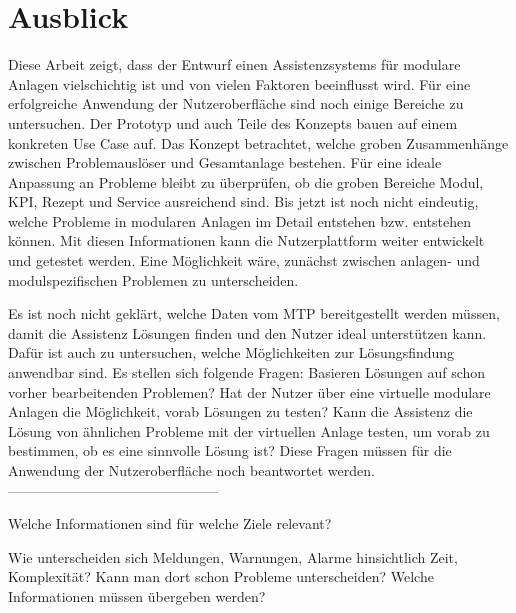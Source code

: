 \chapter{Ausblick}
\label{Ausblick}
Diese Arbeit zeigt, dass der Entwurf einen Assistenzsystems für modulare Anlagen vielschichtig ist und von vielen Faktoren beeinflusst wird. Für eine erfolgreiche Anwendung der Nutzeroberfläche sind noch einige Bereiche zu untersuchen. Der Prototyp und auch Teile des Konzepts bauen auf einem konkreten Use Case auf. Das Konzept betrachtet, welche groben Zusammenhänge zwischen Problemauslöser und Gesamtanlage bestehen. Für eine ideale Anpassung an Probleme bleibt zu überprüfen, ob die groben Bereiche Modul, KPI, Rezept und Service ausreichend sind. Bis jetzt ist noch nicht eindeutig, welche Probleme in modularen Anlagen im Detail entstehen bzw. entstehen können. Mit diesen Informationen kann die Nutzerplattform weiter entwickelt und getestet werden. Eine Möglichkeit wäre, zunächst zwischen anlagen- und modulspezifischen Problemen zu unterscheiden. 


Es ist noch nicht geklärt, welche Daten vom MTP bereitgestellt werden müssen, damit die Assistenz Lösungen finden und den Nutzer ideal unterstützen kann. Dafür ist auch zu untersuchen, welche Möglichkeiten zur Lösungsfindung anwendbar sind. Es stellen sich folgende Fragen: Basieren Lösungen auf schon vorher bearbeitenden Problemen? Hat der Nutzer über eine virtuelle modulare Anlagen die Möglichkeit, vorab Lösungen zu testen? Kann die Assistenz die Lösung von ähnlichen Probleme mit der virtuellen Anlage testen, um vorab zu bestimmen, ob es eine sinnvolle Lösung ist? Diese Fragen müssen für die Anwendung der Nutzeroberfläche noch beantwortet werden.
---------------------------------------------

Welche Informationen sind für welche Ziele relevant?

Wie unterscheiden sich Meldungen, Warnungen, Alarme hinsichtlich Zeit, Komplexität? Kann man dort schon Probleme unterscheiden? Welche Informationen müssen übergeben werden?

